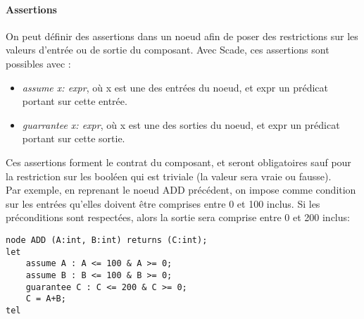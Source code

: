 \paragraph{Assertions}
On peut définir des assertions dans un noeud afin de poser des
restrictions sur les valeurs d'entrée ou de sortie du composant. Avec
Scade, ces assertions sont possibles avec :
\begin{itemize}
\item \emph{assume x: expr}, où x est une des entrées du noeud, et
expr un prédicat portant sur cette entrée.
\item \emph{guarrantee x: expr}, où x est une des sorties du noeud, et
expr un prédicat portant sur cette sortie.
\end{itemize}
Ces assertions forment le contrat du composant, et seront
obligatoires sauf pour la restriction sur les booléen qui est triviale (la
valeur sera vraie ou fausse).\\
Par exemple, en reprenant le noeud ADD précédent, on impose comme condition sur
les entrées qu'elles doivent être comprises entre 0 et 100 inclus. Si les
préconditions sont respectées, alors la sortie sera comprise entre 0 et 200 inclus:
\begin{verbatim}
node ADD (A:int, B:int) returns (C:int);
let 
    assume A : A <= 100 & A >= 0;
    assume B : B <= 100 & B >= 0;
    guarantee C : C <= 200 & C >= 0;
    C = A+B;
tel
\end{verbatim}

